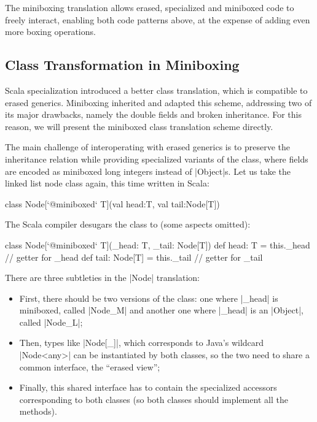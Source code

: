 The miniboxing translation allows erased, specialized and miniboxed code to freely interact, enabling both code patterns above, at the expense of adding even more boxing operations.

\subsection{Class Transformation in Miniboxing}

Scala specialization \cite{iuli-thesis, specialization-iuli} introduced a better class translation, which is compatible to erased generics. Miniboxing \cite{miniboxing} inherited and adapted this scheme, addressing two of its major drawbacks, namely the double fields and broken inheritance. For this reason, we will present the miniboxed class translation scheme directly.

The main challenge of interoperating with erased generics is to preserve the inheritance relation while providing specialized variants of the class, where fields are encoded as miniboxed long integers instead of |Object|s. Let us take the linked list node class again, this time written in Scala:

\begin{lstlisting-nobreak}
 class Node[`@miniboxed` T](val head:T, val tail:Node[T])
\end{lstlisting-nobreak}

The Scala compiler desugars the class to (some aspects omitted):

\begin{lstlisting-nobreak}
 class Node[`@miniboxed` T](_head: T, _tail: Node[T]) {
   def head: T = this._head                 // getter for _head
   def tail: Node[T] = this._tail // getter for _tail
 }
\end{lstlisting-nobreak}

There are three subtleties in the |Node| translation:
\begin{itemize}
  \item First, there should be two versions of the class: one where |_head| is miniboxed, called |Node_M| and another one where |_head| is an |Object|, called |Node_L|;
  \item Then, types like |Node[_]|, which corresponds to Java's wildcard |Node<any>| can be instantiated by both classes, so the two need to share a common interface, the ``erased view'';
  \item Finally, this shared interface has to contain the specialized accessors corresponding to both classes (so both classes should implement all the methods).
\end{itemize}

